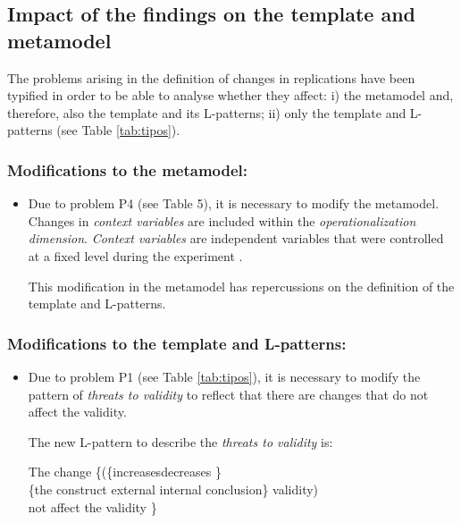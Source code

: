 \subsection{Impact of the findings on the template and metamodel}
\label{sec:impact}

The problems arising in the definition of changes in replications have been typified in order to be able to analyse whether they affect: i) the metamodel and, therefore, also the template and its L-patterns; ii) only the template and L-patterns (see Table \ref{tab:tipos}).


\subsubsection{Modifications to the metamodel:}
\begin{itemize}
    \item  Due to problem P4 (see Table 5), it is necessary to modify the metamodel. Changes in \emph{context variables} are included within the \emph{operationalization dimension}. \emph{Context variables} are independent variables that were controlled at a fixed level during the experiment \cite{wohlin:experimentation}.
    
    This modification in the metamodel has repercussions on the definition of the template and L-patterns.
\end{itemize}

\subsubsection{Modifications to the template and L-patterns:}
\begin{itemize}
    \item Due to problem P1 (see Table \ref{tab:tipos}), it is necessary to modify the pattern of \emph{threats to validity} to reflect that there are changes that do not affect the validity. 
    
    The new L-pattern to describe the  \emph{threats to validity} is:
    
     The change  \{(\{increases\textbar decreases \} \\
     \{the construct  \textbar external \textbar internal \textbar conclusion\} validity) \\
     \textbar  not affect the validity \}  \\
\end{itemize}

